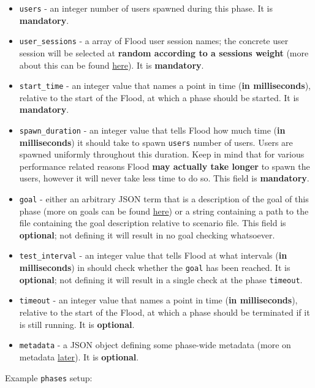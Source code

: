 \documentclass[a4paper]{article}
\begin{document}
\begin{itemize}
\item \texttt{users} - an integer number of users spawned during this phase. It is \textbf{mandatory}.
\item \texttt{user\_sessions} - a array of Flood user session names; the concrete user session will be selected at \textbf{random according to a sessions weight} (more about this can be found \hyperref[sec-2-2]{here}). It is \textbf{mandatory}.
\item \texttt{start\_time} - an integer value that names a point in time (\textbf{in milliseconds}), relative to the start of the Flood, at which a phase should be started. It is \textbf{mandatory}.
\item \texttt{spawn\_duration} - an integer value that tells Flood how much time (\textbf{in milliseconds}) it should take to spawn \texttt{users} number of users. Users are spawned uniformly throughout this duration. Keep in mind that for various performance related reasons Flood \textbf{may actually take longer} to spawn the users, however it will never take less time to do so. This field is \textbf{mandatory}.
\item \texttt{goal} - either an arbitrary JSON term that is a description of the goal of this phase (more on goals can be found \hyperref[sec-2-3]{here}) or a string containing a path to the file containing the goal description relative to scenario file. This field is \textbf{optional}; not defining it will result in no goal checking whatsoever.
\item \texttt{test\_interval} - an integer value that tells Flood at what intervals (\textbf{in milliseconds}) in should check whether the \texttt{goal} has been reached. It is \textbf{optional}; not defining it will result in a single check at the phase \texttt{timeout}.
\item \texttt{timeout} - an integer value that names a point in time (\textbf{in milliseconds}), relative to the start of the Flood, at which a phase should be terminated if it is still running. It is \textbf{optional}.
\item \texttt{metadata} - a JSON object defining some phase-wide metadata (more on metadata \hyperref[sec-3-5]{later}). It is \textbf{optional}.
\end{itemize}

\noindent
Example \texttt{phases} setup:
\end{document}

